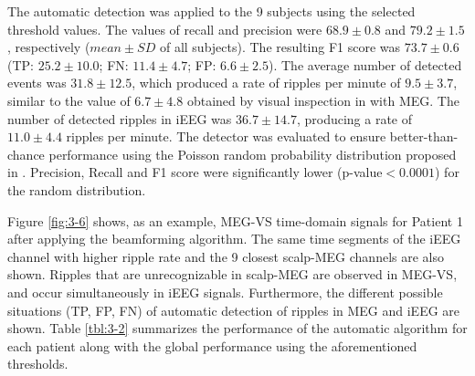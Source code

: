 The automatic detection was applied to the 9 subjects using the selected threshold values. The values of recall and precision were $68.9 \pm 0.8$ and $79.2 \pm 1.5$, respectively ($mean \pm SD$ of all subjects). The resulting F1 score was $73.7 \pm 0.6$ (TP: $25.2 \pm 10.0$; FN: $11.4 \pm 4.7$; FP: $6.6 \pm 2.5$). The average number of detected events was $31.8 \pm 12.5$, which produced a rate of ripples per minute of $9.5 \pm 3.7$, similar to the value of $6.7 \pm 4.8$ obtained by visual inspection in \citep{vanKlink2015} with MEG. The number of detected ripples in iEEG was $36.7 \pm 14.7$, producing a rate of $11.0 \pm 4.4$ ripples per minute. The detector was evaluated to ensure better-than-chance performance  \citep{Andrzejak2009} using the Poisson random probability distribution proposed in \citep{Snyder2008}. Precision, Recall and F1 score were significantly lower (p-value$<0.0001$) for the random distribution. 

Figure \ref{fig:3-6} shows, as an example, MEG-VS time-domain signals for Patient 1 after applying the beamforming algorithm. The same time segments of the iEEG channel with higher ripple rate and the 9 closest scalp-MEG channels are also shown. Ripples that are unrecognizable in scalp-MEG are observed in MEG-VS, and occur simultaneously in iEEG signals. Furthermore, the different possible situations (TP, FP, FN) of automatic detection of ripples in MEG and iEEG are shown. Table \ref{tbl:3-2} summarizes the performance of the automatic algorithm for each patient along with the global performance using the aforementioned thresholds. 


